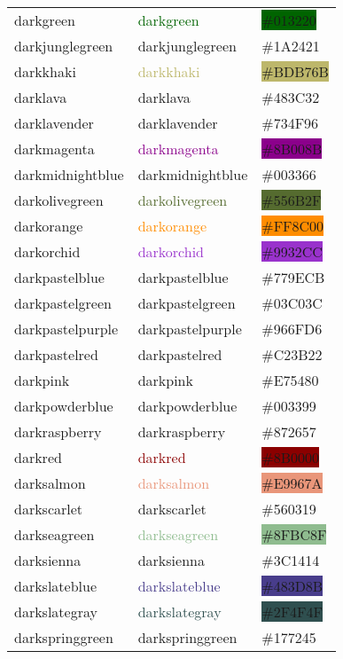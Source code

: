\documentclass[
]{article}
\begin{document}
\begin{longtable}[]{@{}lll@{}}
darkgreen & \textcolor{darkgreen}{darkgreen} &
\colorbox{darkgreen}{\#013220}\tabularnewline
darkjunglegreen & \textcolor{darkjunglegreen}{darkjunglegreen} &
\colorbox{darkjunglegreen}{\#1A2421}\tabularnewline
darkkhaki & \textcolor{darkkhaki}{darkkhaki} &
\colorbox{darkkhaki}{\#BDB76B}\tabularnewline
darklava & \textcolor{darklava}{darklava} &
\colorbox{darklava}{\#483C32}\tabularnewline
darklavender & \textcolor{darklavender}{darklavender} &
\colorbox{darklavender}{\#734F96}\tabularnewline
darkmagenta & \textcolor{darkmagenta}{darkmagenta} &
\colorbox{darkmagenta}{\#8B008B}\tabularnewline
darkmidnightblue & \textcolor{darkmidnightblue}{darkmidnightblue} &
\colorbox{darkmidnightblue}{\#003366}\tabularnewline
darkolivegreen & \textcolor{darkolivegreen}{darkolivegreen} &
\colorbox{darkolivegreen}{\#556B2F}\tabularnewline
darkorange & \textcolor{darkorange}{darkorange} &
\colorbox{darkorange}{\#FF8C00}\tabularnewline
darkorchid & \textcolor{darkorchid}{darkorchid} &
\colorbox{darkorchid}{\#9932CC}\tabularnewline
darkpastelblue & \textcolor{darkpastelblue}{darkpastelblue} &
\colorbox{darkpastelblue}{\#779ECB}\tabularnewline
darkpastelgreen & \textcolor{darkpastelgreen}{darkpastelgreen} &
\colorbox{darkpastelgreen}{\#03C03C}\tabularnewline
darkpastelpurple & \textcolor{darkpastelpurple}{darkpastelpurple} &
\colorbox{darkpastelpurple}{\#966FD6}\tabularnewline
darkpastelred & \textcolor{darkpastelred}{darkpastelred} &
\colorbox{darkpastelred}{\#C23B22}\tabularnewline
darkpink & \textcolor{darkpink}{darkpink} &
\colorbox{darkpink}{\#E75480}\tabularnewline
darkpowderblue & \textcolor{darkpowderblue}{darkpowderblue} &
\colorbox{darkpowderblue}{\#003399}\tabularnewline
darkraspberry & \textcolor{darkraspberry}{darkraspberry} &
\colorbox{darkraspberry}{\#872657}\tabularnewline
darkred & \textcolor{darkred}{darkred} &
\colorbox{darkred}{\#8B0000}\tabularnewline
darksalmon & \textcolor{darksalmon}{darksalmon} &
\colorbox{darksalmon}{\#E9967A}\tabularnewline
darkscarlet & \textcolor{darkscarlet}{darkscarlet} &
\colorbox{darkscarlet}{\#560319}\tabularnewline
darkseagreen & \textcolor{darkseagreen}{darkseagreen} &
\colorbox{darkseagreen}{\#8FBC8F}\tabularnewline
darksienna & \textcolor{darksienna}{darksienna} &
\colorbox{darksienna}{\#3C1414}\tabularnewline
darkslateblue & \textcolor{darkslateblue}{darkslateblue} &
\colorbox{darkslateblue}{\#483D8B}\tabularnewline
darkslategray & \textcolor{darkslategray}{darkslategray} &
\colorbox{darkslategray}{\#2F4F4F}\tabularnewline
darkspringgreen & \textcolor{darkspringgreen}{darkspringgreen} &
\colorbox{darkspringgreen}{\#177245}\tabularnewline

\end{longtable}
\end{document}
